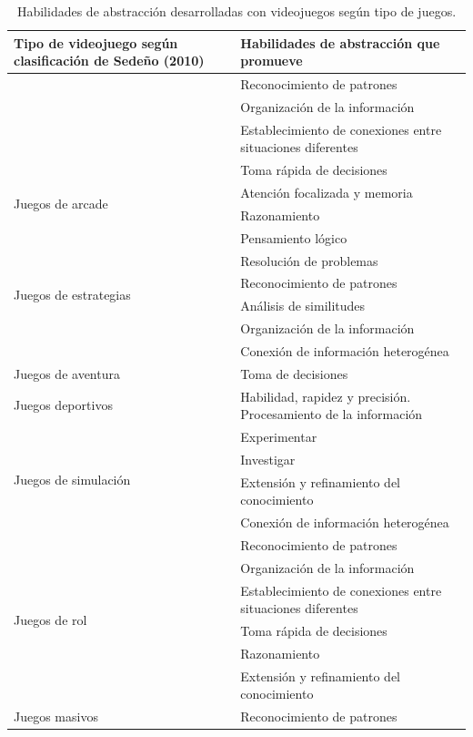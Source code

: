 \documentclass{textolivre}
\begin{document}
\begin{table}[htbp]
\caption{Habilidades de abstracción desarrolladas con videojuegos según tipo de juegos.}
\label{tab1}
\centering
\begin{tabular}{p{}p{}}
\toprule
Tipo de videojuego según clasificación de Sedeño (2010) & Habilidades de abstracción que promueve \\ 
\midrule
\arrayrulecolor[gray]{.7}
\multirow{4}{=}{Juegos de acción} & Reconocimiento de patrones \\ 
 & Organización de la información \\ 
 & Establecimiento de conexiones entre situaciones diferentes\\
 & Toma rápida de decisiones \\ 
\midrule
\multirow{2}{=}{Juegos de arcade} & Atención focalizada y memoria \\ 
 & Razonamiento \\ 
\midrule
\multirow{6}{=}{Juegos de estrategias} & Pensamiento lógico\\
 & Resolución de problemas\\ 
 & Reconocimiento de patrones\\ 
 & Análisis de similitudes\\ 
 & Organización de la información\\ 
 & Conexión de información heterogénea \\ 
\midrule
Juegos de aventura & Toma de decisiones \\ 
\midrule
Juegos deportivos  & Habilidad, rapidez y precisión. Procesamiento de la información  \\ 
\midrule
\multirow{4}{=}{Juegos de simulación} & Experimentar\\ 
 & Investigar\\ 
 & Extensión y refinamiento del conocimiento\\
 & Conexión de información heterogénea \\ 
\midrule
\multirow{6}{=}{Juegos de rol} & Reconocimiento de patrones\\
 & Organización de la información\\ 
 & Establecimiento de conexiones entre situaciones diferentes\\
 & Toma rápida de decisiones\\ 
 & Razonamiento\\ 
 & Extensión y refinamiento del conocimiento \\ 
\midrule
\multirow{4}{=}{Juegos masivos} & Reconocimiento de  patrones\\ 

\end{tabular}
\end{table}
\end{document}
